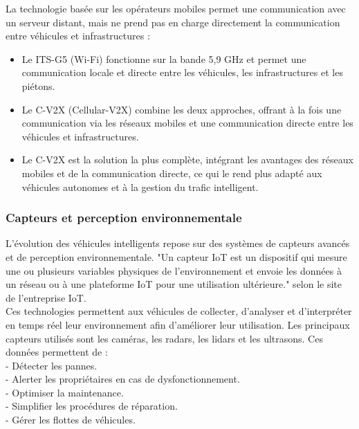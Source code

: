 La technologie basée sur les opérateurs mobiles permet une communication avec un serveur distant, mais ne prend pas en charge directement la communication entre véhicules et infrastructures : 
\begin{itemize}
    \item Le ITS-G5 (Wi-Fi) fonctionne sur la bande 5,9 GHz et permet une communication locale et directe entre les véhicules, les infrastructures et les piétons.
    \item Le C-V2X (Cellular-V2X) combine les deux approches, offrant à la fois une communication via les réseaux mobiles et une communication directe entre les véhicules et infrastructures.
    \item Le C-V2X est la solution la plus complète, intégrant les avantages des réseaux mobiles et de la communication directe, ce qui le rend plus adapté aux véhicules autonomes et à la gestion du trafic intelligent.
\end{itemize}

\subsubsection{Capteurs et perception environnementale}
L'évolution des véhicules intelligents repose sur des systèmes de capteurs avancés et de perception environnementale. "Un capteur IoT est un dispositif qui mesure une ou plusieurs variables physiques de l'environnement et envoie les données à un réseau ou à une plateforme IoT pour une utilisation ultérieure." selon le site de l'entreprise IoT\cite{iot_capteur}.\\
Ces technologies permettent aux véhicules de collecter, d'analyser et d'interpréter en temps réel leur environnement afin d'améliorer leur utilisation.
Les principaux capteurs utilisés sont les caméras, les radars, les lidars et les ultrasons.
Ces données permettent de :\\
- Détecter les pannes. \\
- Alerter les propriétaires en cas de dysfonctionnement. \\
- Optimiser la maintenance. \\
- Simplifier les procédures de réparation. \\
- Gérer les flottes de véhicules. \\


